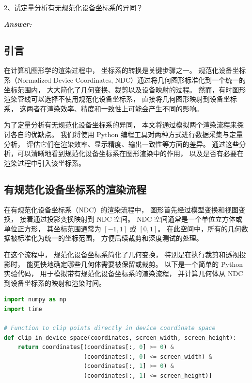 \documentclass[12pt]{article}
\newenvironment{Answer}{
  \vspace{12pt}
  {\large\textbf{\textit{\hspace{-12pt}Answer:}}}\par
  \vspace{8pt}
} {\vspace{24pt}}
\begin{document}
\begin{question}{}{}
2、试定量分析有无规范化设备坐标系的异同？
\end{question}
\begin{Answer}

\subsection*{引言}
\noindent

在计算机图形学的渲染过程中，
坐标系的转换是关键步骤之一。
规范化设备坐标系（Normalized Device Coordinates, NDC）通过将几何图形标准化到一个统一的坐标范围内，
大大简化了几何变换、裁剪以及设备映射的过程。
然而，有时图形渲染管线可以选择不使用规范化设备坐标系，
直接将几何图形映射到设备坐标系，
这两者在渲染效率、精度和一致性上可能会产生不同的影响。

为了定量分析有无规范化设备坐标系的异同，
本文将通过模拟两个渲染流程来探讨各自的优缺点。
我们将使用 Python 编程工具对两种方式进行数据采集与定量分析，
评估它们在渲染效率、显示精度、输出一致性等方面的差异。
通过这些分析，可以清晰地看到规范化设备坐标系在图形渲染中的作用，
以及是否有必要在渲染过程中引入该坐标系。

\subsection*{有规范化设备坐标系的渲染流程}
\noindent

在有规范化设备坐标系（NDC）的渲染流程中，
图形首先经过模型变换和视图变换，
接着通过投影变换映射到 NDC 空间。
NDC 空间通常是一个单位立方体或单位正方形，
其坐标范围通常为 $[-1, 1]$ 或 $[0, 1]$。
在此空间中，所有的几何数据被标准化为统一的坐标范围，
方便后续裁剪和深度测试的处理。

在这个流程中，
规范化设备坐标系简化了几何变换，
特别是在执行裁剪和透视投影时，
能更快地确定哪些几何体需要被保留或裁剪。
以下是一个简单的 Python 实验代码，
用于模拟带有规范化设备坐标系的渲染流程，
并计算几何体从 NDC 到设备坐标系的映射和渲染时间。

\begin{lstlisting}[language=Python, caption=Simulating NDC Rendering Pipeline]
import numpy as np
import time

# Function to clip points directly in device coordinate space
def clip_in_device_space(coordinates, screen_width, screen_height):
    return coordinates[(coordinates[:, 0] >= 0) & 
                       (coordinates[:, 0] <= screen_width) & 
                       (coordinates[:, 1] >= 0) & 
                       (coordinates[:, 1] <= screen_height)]


\end{lstlisting}
\end{Answer}
\end{document}
